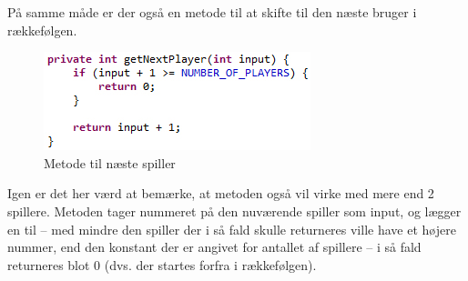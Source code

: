 På samme måde er der også en metode til at skifte til den næste bruger i rækkefølgen.
\begin{figure}[!ht]
\centering
\includegraphics[scale=0.4]{Game-illustration6.jpg}
\caption[<Text for the list of figures>]{Metode til næste spiller}
\label{fig:figure 2} 
\end{figure}
Igen er det her værd at bemærke, at metoden også vil virke med mere end 2 spillere. Metoden tager nummeret på den nuværende spiller som input, og lægger en til – med mindre den spiller der i så fald skulle returneres ville have et højere nummer, end den konstant der er angivet for antallet af spillere – i så fald returneres blot 0 (dvs. der startes forfra i rækkefølgen).